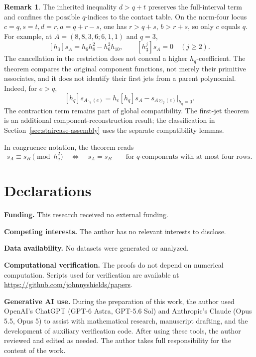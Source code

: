\documentclass[11pt,a4paper]{amsart}
\numberwithin{equation}{section}
\theoremstyle{plain}
\theoremstyle{definition}
\newtheorem{remark}[theorem]{Remark}
\begin{document}
\begin{remark}
The inherited inequality \(d>q+t\) preserves the full-interval term
and confines the possible \(q\)-indices to the contact table.
On the norm-four locus \(c=q,s=t,d=r,a=q+r-s\), one has
\(r>q+s\), \(b>r+s\), so only \(c\) equals \(q\).
For example, at \(A=(8,8,3,6;6,1,1)\) and \(q=3\),
\[
 [h_3]s_A=h_6h_8^2-h_6^2h_{10},\qquad
 [h_3^j]s_A=0\quad(j\ge2).
\]
The cancellation in the restriction does not conceal a higher
\(h_q\)-coefficient.  The theorem compares the original component
functions, not merely their primitive associates, and it does not identify
their first jets from a parent polynomial.  Indeed, for \(e>q\),
\[
 [h_q]s_{A\cdot_q(e)}
 =h_e[h_q]s_A-s_{A\odot_q(e)}\big|_{h_q=0}.
\]
The contraction term remains part of global compatibility.
The first-jet theorem is an additional component-reconstruction result;
the classification in Section~\ref{sec:staircase-assembly} uses
the separate compatibility lemmas.
\end{remark}

In congruence notation, the theorem reads
\begin{equation}\label{eq:farkas}
 s_A\equiv s_B\pmod{h_q^2}
 \quad\Longleftrightarrow\quad s_A=s_B
 \qquad\text{for \(q\)-components with at most four rows}.
\end{equation}

\section*{Declarations}

{\footnotesize
\noindent\textbf{Funding.} This research received no external funding.

\smallskip
\noindent\textbf{Competing interests.} The author has no relevant interests to disclose.

\smallskip
\noindent\textbf{Data availability.} No datasets were generated or analyzed.

\smallskip
\noindent\textbf{Computational verification.} The proofs do not depend on numerical computation.  Scripts used for verification are available at \url{https://github.com/johnnyshields/papers}.

\smallskip
\noindent\textbf{Generative AI use.} During the preparation of this work, the author used OpenAI's ChatGPT (GPT-6 Astra, GPT-5.6 Sol) and Anthropic's Claude (Opus 5.5, Opus 5) to assist with mathematical research, manuscript drafting, and the development of auxiliary verification code.  After using these tools, the author reviewed and edited as needed.  The author takes full responsibility for the content of the work.
\par}
\end{document}
